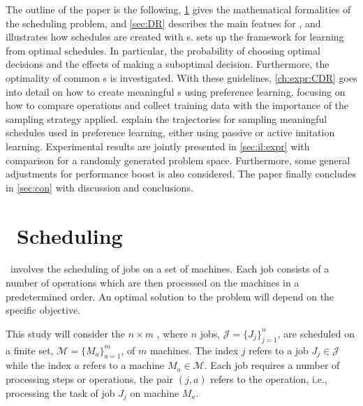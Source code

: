 \documentclass[twocolumn]{svjour3}
\begin{document}
The outline of the paper is the following, \cref{sec:problemdef} gives the 
mathematical formalities of the scheduling problem, and 
\cref{sec:DR} describes the main featues for \jsp, 
and illustrates how schedules are created with \dr s. 
 sets up the framework for learning from optimal schedules. 
In particular, the probability of choosing optimal decisions and the effects of 
making a suboptimal decision. Furthermore, the optimality of common \sdr s is 
investigated.
With these guidelines, \cref{ch:expr:CDR} goes into detail on how to create 
meaningful \cdr s using preference learning, focusing on how to 
compare operations and collect training data with the importance of  the
sampling strategy applied. 
 explain the trajectories for 
sampling meaningful schedules used in preference learning, either 
using passive or active imitation learning. 
Experimental results are jointly presented in \cref{sec:il:expr} with 
comparison for a randomly generated problem space. 
Furthermore, some general adjustments for performance boost is also considered.
The paper finally concludes in \cref{sec:con} with discussion and conclusions.

\section{\Jsp~Scheduling}\label{sec:problemdef}
\JSP\ involves the scheduling of jobs on a set of 
machines. Each job consists of a number of operations which are then processed 
on the machines in a predetermined order. An optimal solution to the problem 
will depend on the specific objective. 

This study will consider the $n\times m$ \JSP, where $n$ jobs, 
$\mathcal{J}=\{J_j\}_{j=1}^n$, are scheduled on a finite set, 
$\mathcal{M}=\{M_a\}_{a=1}^m$, of $m$ machines. The index $j$ refers to a job 
$J_j\in\mathcal{J}$ while the index $a$ refers to a machine 
$M_a\in\mathcal{M}$. 
Each job requires a number of processing steps or operations, the pair 
$(j,a)$ refers to the operation, i.e., processing the task of job $J_j$ on 
machine $M_a$. 
\end{document}
